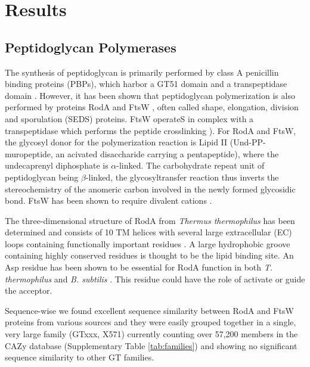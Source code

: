 \documentclass{article}
\begin{document}

\section{Results}

\subsection{Peptidoglycan Polymerases}
The synthesis of peptidoglycan is primarily performed by class A penicillin binding proteins (PBPs), which harbor a GT51 domain and a transpeptidase domain \cite{goffin_multimodular_1998}. %
However, it has been shown that peptidoglycan polymerization is also performed by proteins RodA \cite{cho_assembly_2023} and FtsW \cite{taguchi_ftsw_2019}, often called shape, elongation, division and sporulation (SEDS) proteins.  FtsW operateS in complex with a transpeptidase which performs the peptide crosslinking \cite{sjodt_structure_2018}). %
For RodA and FtsW, the glycosyl donor for the polymerization reaction is Lipid II (Und-PP-muropeptide, an acivated disaccharide carrying a pentapeptide), where the undecaprenyl diphosphate is $\alpha$-linked. The carbohydrate repeat unit of peptidoglycan being  $\beta$-linked,  the glycosyltransfer reaction thus inverts the stereochemistry of the anomeric carbon involved in the newly formed glycosidic bond. FtsW has been shown to require divalent cations \cite{taguchi_ftsw_2019}.

The three-dimensional structure of RodA from \textit{Thermus thermophilus} has been determined and consists of 10 TM helices with several large extracellular (EC) loops containing functionally important residues \cite{sjodt_structure_2018}. A large hydrophobic groove containing highly conserved residues is thought to be the lipid binding site. An Asp residue has been shown to be essential for RodA function in both \textit{T. thermophilus} and \textit{B. subtilis} \cite{sjodt_structure_2018, meeske_seds_2016}. This residue could have the role of activate or guide the acceptor.

Sequence-wise we found excellent sequence similarity between RodA and FtsW proteins from various sources and they were easily grouped together in a single, very large family (GTxxx, X571) currently counting over 57,200 members in the CAZy database (Supplementary Table \ref{tab:families}) and showing no significant sequence similarity to other GT families. 
\end{document}
